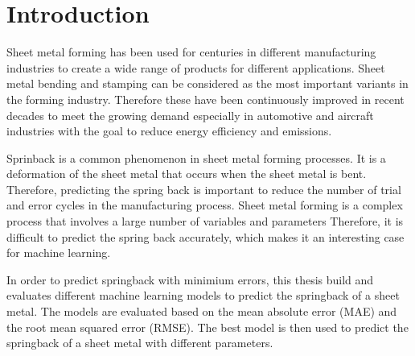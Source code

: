 \chapter{Introduction}

Sheet metal forming has been used for centuries in different manufacturing industries
to create a wide range of products for different applications.
Sheet metal bending and stamping can be considered as the most important variants in
the forming industry. \cite[p. 1]{cruz_applicationmachinelearning_2021}
Therefore these have been continuously improved in recent decades to meet the growing
demand especially in automotive and aircraft industries with the goal to reduce energy
efficiency and emissions. \cite[p. 4]{zheng_reviewformingtechniques_2018}

Sprinback is a common phenomenon in sheet metal forming processes. It is a deformation
of the sheet metal that occurs when the sheet metal is bent. Therefore, predicting the
spring back is important to reduce the number of trial and error cycles in the
manufacturing process. \cite[p. 1]{cruz_applicationmachinelearning_2021}
Sheet metal forming is a complex process that involves a large number of variables and
parameters Therefore, it is difficult to predict the spring back accurately, which
makes it an interesting case for machine learning.

In order to predict springback with minimium errors, this thesis build and evaluates
different machine learning models to predict the springback of a sheet metal. The
models are evaluated based on the mean absolute error (MAE) and the root mean squared
error (RMSE). The best model is then used to predict the springback of a sheet metal
with different parameters.




%
